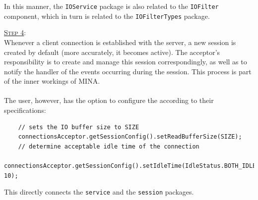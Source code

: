 In this manner, the \texttt{IOService} package is also related to the \texttt{IOFilter} component, which in turn is related to the \texttt{IOFilterTypes} package.

\underline{\textsc{Step 4}}:\\
Whenever a client connection is established with the server, a new session is created by default (more accurately, it becomes active). The acceptor's responsibility is to create and manage this session correspondingly, as well as to notify the handler of the events occurring during the session. This process is part of the inner workings of MINA.\\\\
The user, however, has the option to configure the  according to their specifications:

\begin{verbatim}
    // sets the IO buffer size to SIZE
    connectionsAcceptor.getSessionConfig().setReadBufferSize(SIZE);
    // determine acceptable idle time of the connection
    connectionsAcceptor.getSessionConfig().setIdleTime(IdleStatus.BOTH_IDLE, 10);
\end{verbatim}

This directly connects the \texttt{service} and the \texttt{session} packages.






